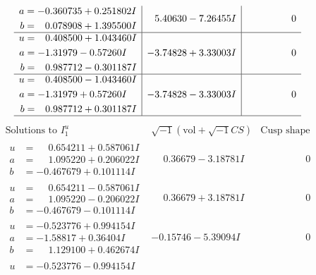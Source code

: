 \documentclass[1p]{elsarticle_modified}
\theoremstyle{definition}
\newcommand{\I}{\sqrt{-1}}
\begin{document}
$$\begin{array}{c|c|c}
\begin{aligned}
a &= -0.360735 + 0.251802 I \\
b &= \phantom{-}0.078908 + 1.395500 I\end{aligned}
 & \phantom{-}5.40630 - 7.26455 I & \phantom{-0.000000 } 0 \\ \hline\begin{aligned}
u &= \phantom{-}0.408500 + 1.043460 I \\
a &= -1.31979 - 0.57260 I \\
b &= \phantom{-}0.987712 - 0.301187 I\end{aligned}
 & -3.74828 + 3.33003 I & \phantom{-0.000000 } 0 \\ \hline\begin{aligned}
u &= \phantom{-}0.408500 - 1.043460 I \\
a &= -1.31979 + 0.57260 I \\
b &= \phantom{-}0.987712 + 0.301187 I\end{aligned}
 & -3.74828 - 3.33003 I & \phantom{-0.000000 } 0\\
 \hline 
 \end{array}$$\newpage$$\begin{array}{c|c|c}  
\text{Solutions to }I^u_{1}& \I (\text{vol} + \sqrt{-1}CS) & \text{Cusp shape}\\
 \hline 
\begin{aligned}
u &= \phantom{-}0.654211 + 0.587061 I \\
a &= \phantom{-}1.095220 + 0.206022 I \\
b &= -0.467679 + 0.101114 I\end{aligned}
 & \phantom{-}0.36679 - 3.18781 I & \phantom{-0.000000 } 0 \\ \hline\begin{aligned}
u &= \phantom{-}0.654211 - 0.587061 I \\
a &= \phantom{-}1.095220 - 0.206022 I \\
b &= -0.467679 - 0.101114 I\end{aligned}
 & \phantom{-}0.36679 + 3.18781 I & \phantom{-0.000000 } 0 \\ \hline\begin{aligned}
u &= -0.523776 + 0.994154 I \\
a &= -1.58817 + 0.36404 I \\
b &= \phantom{-}1.129100 + 0.462674 I\end{aligned}
 & -0.15746 - 5.39094 I & \phantom{-0.000000 } 0 \\ \hline\begin{aligned}
u &= -0.523776 - 0.994154 I \\

\end{aligned}
\end{array}$$
\end{document}
